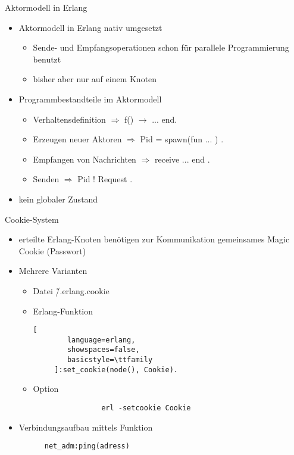 \documentclass[10pt]{article}
\begin{document}
Aktormodell in Erlang
\begin{itemize}
  \item Aktormodell in Erlang nativ umgesetzt
        \begin{itemize}
          \item Sende- und Empfangsoperationen schon für parallele Programmierung benutzt
          \item bisher aber nur auf einem Knoten
        \end{itemize}
  \item Programmbestandteile im Aktormodell
        \begin{itemize}
          \item Verhaltensdefinition $\Rightarrow$ f() $\rightarrow$ ... end.
          \item Erzeugen neuer Aktoren $\Rightarrow$ Pid = spawn(fun ... ) .
          \item Empfangen von Nachrichten $\Rightarrow$ receive ... end .
          \item Senden $\Rightarrow$ Pid ! Request .
        \end{itemize}
  \item kein globaler Zustand
\end{itemize}

Cookie-System
\begin{itemize}
  \item erteilte Erlang-Knoten benötigen zur Kommunikation gemeinsames Magic Cookie (Passwort)
  \item Mehrere Varianten
        \begin{itemize}
          \item Datei \~/.erlang.cookie
          \item Erlang-Funktion
                \begin{lstlisting}[
        language=erlang,
        showspaces=false,
        basicstyle=\ttfamily
     ]:set_cookie(node(), Cookie).
    \end{lstlisting}
          \item Option
                \begin{lstlisting}
                erl -setcookie Cookie
              \end{lstlisting}
        \end{itemize}
  \item Verbindungsaufbau mittels Funktion
        \begin{lstlisting}
      net_adm:ping(adress)
    \end{lstlisting}
\end{itemize}
\end{document}

